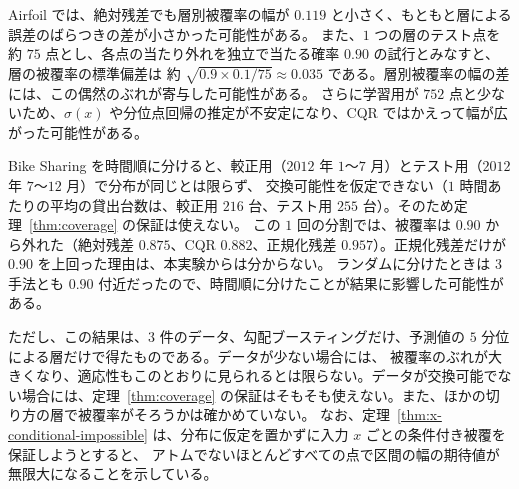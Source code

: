 \documentclass[a4paper,11pt]{jsarticle}
\theoremstyle{definition}
\theoremstyle{plain}
\theoremstyle{remark}
\begin{document}
Airfoil では、絶対残差でも層別被覆率の幅が $0.119$ と小さく、もともと層による誤差のばらつきの差が小さかった可能性がある。
また、$1$ つの層のテスト点を約 $75$ 点とし、各点の当たり外れを独立で当たる確率 $0.90$ の試行とみなすと、層の被覆率の標準偏差は
約 $\sqrt{0.9\times0.1/75}\approx0.035$ である。層別被覆率の幅の差には、この偶然のぶれが寄与した可能性がある。
さらに学習用が $752$ 点と少ないため、$\hat\sigma(x)$ や分位点回帰の推定が不安定になり、CQR ではかえって幅が広がった可能性がある。

Bike Sharing を時間順に分けると、較正用（$2012$ 年 $1$〜$7$ 月）とテスト用（$2012$ 年 $7$〜$12$ 月）で分布が同じとは限らず、
交換可能性を仮定できない（$1$ 時間あたりの平均の貸出台数は、較正用 $216$ 台、テスト用 $255$ 台）。そのため定理~\ref{thm:coverage} の保証は使えない。
この $1$ 回の分割では、被覆率は $0.90$ から外れた（絶対残差 $0.875$、CQR $0.882$、正規化残差 $0.957$）。正規化残差だけが $0.90$ を上回った理由は、本実験からは分からない。
ランダムに分けたときは $3$ 手法とも $0.90$ 付近だったので、時間順に分けたことが結果に影響した可能性がある。

ただし、この結果は、$3$ 件のデータ、勾配ブースティングだけ、予測値の $5$ 分位による層だけで得たものである。データが少ない場合には、
被覆率のぶれが大きくなり、適応性もこのとおりに見られるとは限らない。データが交換可能でない場合には、定理~\ref{thm:coverage} の保証はそもそも使えない。また、ほかの切り方の層で被覆率がそろうかは確かめていない。
なお、定理~\ref{thm:x-conditional-impossible} は、分布に仮定を置かずに入力 $x$ ごとの条件付き被覆を保証しようとすると、
アトムでないほとんどすべての点で区間の幅の期待値が無限大になることを示している。


\end{document}
